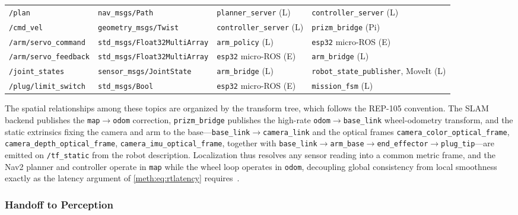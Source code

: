 \begin{table}[!htb]
{\begin{tabular}{@{}llll@{}}
\texttt{/plan} & \texttt{nav\_msgs/Path} & \texttt{planner\_server} (L) & \texttt{controller\_server} (L) \\
\texttt{/cmd\_vel} & \texttt{geometry\_msgs/Twist} & \texttt{controller\_server} (L) & \texttt{prizm\_bridge} (Pi) \\
\texttt{/arm/servo\_command} & \texttt{std\_\allowbreak{}msgs/\allowbreak{}Float32MultiArray} & \texttt{arm\_policy} (L) & \texttt{esp32} micro-ROS (E) \\
\texttt{/arm/servo\_feedback} & \texttt{std\_\allowbreak{}msgs/\allowbreak{}Float32MultiArray} & \texttt{esp32} micro-ROS (E) & \texttt{arm\_bridge} (L) \\
\texttt{/joint\_states} & \texttt{sensor\_msgs/JointState} & \texttt{arm\_bridge} (L) & \texttt{robot\_state\_publisher}, MoveIt (L) \\
\texttt{/plug/limit\_switch} & \texttt{std\_msgs/Bool} & \texttt{esp32} micro-ROS (E) & \texttt{mission\_fsm} (L) \\
\bottomrule
\end{tabular}%
}
\end{table}

The spatial relationships among these topics are organized by the transform tree, which follows the REP-105 convention. The SLAM backend publishes the \texttt{map}$\rightarrow$\texttt{odom} correction, \texttt{prizm\_bridge} publishes the high-rate \texttt{odom}$\rightarrow$\texttt{base\_link} wheel-odometry transform, and the static extrinsics fixing the camera and arm to the base---\texttt{base\_link}$\rightarrow$\texttt{camera\_link} and the optical frames \texttt{camera\_\allowbreak{}color\_\allowbreak{}optical\_\allowbreak{}frame}, \texttt{camera\_\allowbreak{}depth\_\allowbreak{}optical\_\allowbreak{}frame}, \texttt{camera\_\allowbreak{}imu\_\allowbreak{}optical\_\allowbreak{}frame}, together with \texttt{base\_link}$\rightarrow$\texttt{arm\_base}$\rightarrow$\texttt{end\_effector}$\rightarrow$\texttt{plug\_tip}---are emitted on \texttt{/tf\_static} from the robot description. Localization thus resolves any sensor reading into a common metric frame, and the Nav2 planner and controller operate in \texttt{map} while the wheel loop operates in \texttt{odom}, decoupling global consistency from local smoothness exactly as the latency argument of \eqref{meth:eq:rtlatency} requires~\cite{macenski_2020_nav2}.

\subsubsection{Handoff to Perception}

